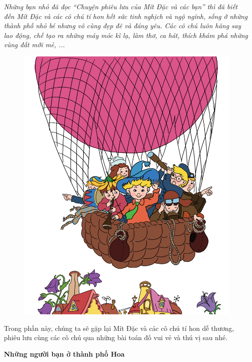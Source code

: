 	\begin{multicols}{2}
		\textit{Những bạn nhỏ đã đọc “Chuyện phiêu lưu của Mít Đặc và các bạn” thì đã biết đến Mít Đặc và các cô chú tí hon hết sức tinh nghịch và ngộ ngĩnh, sống ở những thành phố nhỏ bé nhưng vô cùng đẹp đẽ và đáng yêu. Các cô chú luôn hăng say lao động, chế tạo ra những máy móc kì lạ, làm thơ, ca hát, thích khám phá những vùng đất mới mẻ, ...}
		\begin{figure}[H]
			\centering
			\vspace*{5pt}
			\captionsetup{labelformat= empty, justification=centering}
			\includegraphics[width=0.9\linewidth]{Hinh0}
			\vspace*{-10pt}
		\end{figure}
	\end{multicols}
	Trong phần này, chúng ta sẽ gặp lại Mít Đặc và các cô chú tí hon dễ thương, phiêu lưu cùng các cô chú qua những bài toán đố vui vẻ và thú vị sau nhé.
	\begin{center}
		\textbf{\color{toancuabi}Những người bạn ở thành phố Hoa}
	\end{center}
